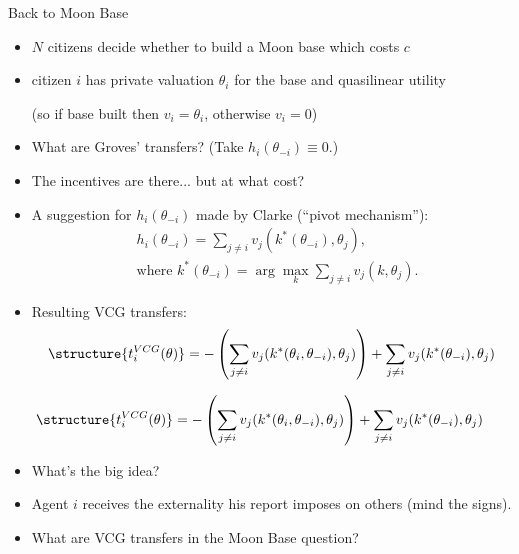 \documentclass[english,handout]{beamer}		%
\def\lyxframeend{} %
\begin{document}
\begin{exampleblock}{Back to Moon Base}
	\begin{itemize}
		\item $N$ citizens decide whether to build a Moon base which costs $c$
		\item citizen $i$ has private valuation $\theta_{i}$ for the base and quasilinear utility
		
		(so if base built then $v_i = \theta_i$, otherwise $v_i = 0$)
	\end{itemize}
\end{exampleblock}
\begin{itemize}
	\item What are Groves' transfers{\tiny\texttrademark}? (Take $h_i(\theta_{-i}) \equiv 0$.)
	\pause
	\item The incentives are there... but at what cost?
\end{itemize}
\lyxframeend


\begin{itemize}
	\item A suggestion for $h_i(\theta_{-i})$ made by Clarke (``pivot mechanism''):
	\vspace{-0.5em}\begin{align*}
	&h_{i}(\theta_{-i})=\sum_{j\neq i} v_{j}(k^*(\theta_{-i}),\theta_{j}),
	\\ &\text{where } k^*(\theta_{-i}) = \arg\max_{k} \sum_{j\neq i}v_{j}(k,\theta_{j}).
	\end{align*}\vspace{-1em}
	\pause
	\item Resulting \alert{VCG transfers}:
	\vspace{-0.5em}\begin{align*}
	\structure{ t_{i}^{VCG}(\theta) } = -\left(\sum_{j\neq i} v_{j}(k^*(\theta_i, \theta_{-i}), \theta_{j}) \right) + \sum_{j\neq i} v_{j}(k^*(\theta_{-i}), \theta_{j})
	\end{align*}\vspace{-1em}
\end{itemize}
\lyxframeend


\vspace{-0.5em}\begin{align*}
\structure{ t_{i}^{VCG}(\theta) } = -\left(\sum_{j\neq i} v_{j}(k^*(\theta_i, \theta_{-i}), \theta_{j}) \right) + \sum_{j\neq i} v_{j}(k^*(\theta_{-i}), \theta_{j})
\end{align*}\vspace{-1em}
\begin{itemize}
	\item What's the big idea?
	\item Agent $i$ receives the externality his report imposes on others (mind the signs).
	\item What are VCG transfers in the Moon Base question?
\end{itemize}
\lyxframeend
\end{document}
